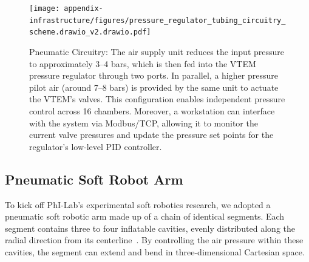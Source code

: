 \begin{figure}[ht]
     \centering
     \texttt{[image: appendix-infrastructure/figures/pressure\_regulator\_tubing\_circuitry\_scheme.drawio\_v2.drawio.pdf]}
     \caption{
     Pneumatic Circuitry: The air supply unit reduces the input pressure to approximately 3–4 bars, which is then fed into the VTEM pressure regulator through two ports. In parallel, a higher pressure pilot air (around 7–8 bars) is provided by the same unit to actuate the VTEM’s valves. This configuration enables independent pressure control across 16 chambers. Moreover, a workstation can interface with the system via Modbus/TCP, allowing it to monitor the current valve pressures and update the pressure set points for the regulator’s low-level PID controller.
     }
     \label{fig:apx:infrastructure:pressure_regulator_tubing_circuitry_scheme}
\end{figure}

\subsection{Pneumatic Soft Robot Arm}
To kick off PhI-Lab’s experimental soft robotics research, we adopted a pneumatic soft robotic arm made up of a chain of identical segments. Each segment contains three to four inflatable cavities, evenly distributed along the radial direction from its centerline~\citep{marchese2015recipe}. By controlling the air pressure within these cavities, the segment can extend and bend in three-dimensional Cartesian space.


